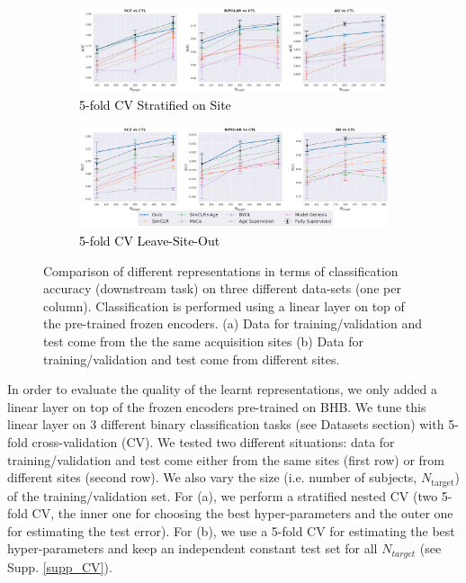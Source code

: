 \documentclass[runningheads]{llncs}
\newcommand{\rebuttal}[1]{\textcolor{black}{#1}}
\begin{document}
\begin{figure}[h!]
\centering
\begin{subfigure}[b]{\textwidth}
   \includegraphics[width=\linewidth]{unsupervised_perf_scz_bip_ad_N10K_cv.png}
   \caption{\rebuttal{5-fold CV Stratified on Site}}
\end{subfigure}

\begin{subfigure}[b]{\textwidth}
   \includegraphics[width=\linewidth]{unsupervised_perf_scz_bip_ad_N10K.png}
   \caption{\rebuttal{5-fold CV Leave-Site-Out}}
\end{subfigure}
\caption{Comparison of different representations in terms of classification accuracy (downstream task) on three different data-sets (one per column). Classification is performed using a linear layer on top of the pre-trained frozen encoders. (a) Data for training/validation and test come from the the same acquisition sites (b) Data for training/validation and test come from different sites.} 

\label{EvaRepr}
\end{figure}

In order to evaluate the quality of the learnt representations, we only added a linear layer on top of the frozen encoders pre-trained on BHB. We tune this linear layer on 3 different binary classification tasks (see Datasets section) with 5-fold cross-validation (CV). We tested two different situations: data for training/validation and test come either from the same sites (first row) or from different sites (second row). We also vary the size (i.e. number of subjects, $N_{\text{target}}$) of the training/validation set. For (a), we perform a stratified nested CV (two 5-fold CV, the inner one for choosing the best hyper-parameters and the outer one for estimating the test error). 
For (b), we use a 5-fold CV for estimating the best hyper-parameters and keep an independent constant test set for all $N_{target}$ (see Supp. \ref{supp_CV}). 
\end{document}
